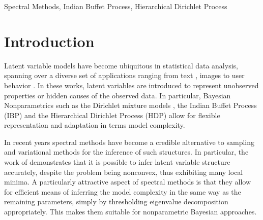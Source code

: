 \documentclass[twoside,11pt]{article}
\begin{document}
\begin{keywords}
  Spectral Methods, Indian Buffet Process, Hierarchical Dirichlet Process
\end{keywords}

\section{Introduction}

Latent variable models have become ubiquitous in statistical data
analysis, spanning over a diverse set of applications ranging from text
\citep{BleNgJor02}, images \citep{QuaColDar04} to user behavior
\citep{AlyHatJosNar12}. In these works, latent variables are introduced to
represent unobserved properties or hidden causes of the observed
data. In particular, Bayesian Nonparametrics such as the Dirichlet mixture 
models \citep{Neal98b}, the Indian Buffet Process (IBP) \citep{GriGha11} 
and the Hierarchical Dirichlet Process (HDP) \citep{TehJorBeaBle06} allow
for flexible representation and adaptation in terms model complexity. 

%

In recent years spectral methods have become a credible alternative to
sampling \citep{GriSte04} and variational methods
\citep{BleJor05,DemLaiRub77} for the inference of such structures.
In particular, the work of
\cite{AnaGeHsuKakTel12,AnaChaHsuKakSonZha2011,BooGreGeo13,HsuKakZha09,SonBooSidGorSmo10}
demonstrates that it is possible to infer latent variable structure
accurately, despite the problem being nonconvex, thus exhibiting many
local minima. A particularly attractive aspect of spectral methods is
that they allow for efficient means of inferring the model complexity
in the same way as the remaining parameters, simply by thresholding
eigenvalue decomposition appropriately. This makes them suitable for
nonparametric Bayesian approaches. 
\end{document}
